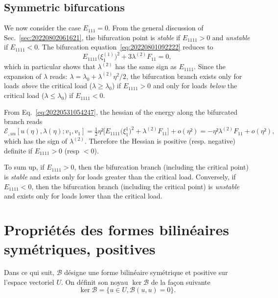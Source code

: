 \documentclass[12pt, final]{scrartcl}
\theoremstyle{definition}
\newcommand{\order}[2][1]{#2^{(#1)}}
\begin{document}
\subsection{Symmetric bifurcations}

We now consider the case \(E_{111}=0\). From the general discussion of
Sec.~\ref{sec:20220802061621}, the bifurcation point is \emph{stable} if
\(E_{1111} > 0\) and \emph{unstable} if \(E_{1111} < 0\). The bifurcation
equation~\eqref{eq:20220801092222} reduces to
\begin{equation}
  E_{1111} \bigl( \order[1]{ξ_1} \bigr)^2 + 3\order[2]λ F_{11} = 0,
\end{equation}
which in particular shows that \(\order[2]λ\) has the same sign as
\(E_{1111}\). Since the expansion of \(λ\) reads:
\(λ = λ_0 + \order[2]λ η^2 / 2\), the bifurcation branch exists only for loads
\emph{above} the critical load (\(λ ≥ λ_0\)) if \(E_{1111} > 0\) and only for
loads \emph{below} the critical load (\(λ ≤ λ_0\)) if \(E_{1111} < 0\).

From Eq.~\eqref{eq:20220531054247}, the hessian of the energy along the
bifurcated branch reads
\begin{equation*}
  ℰ_{, uu}[u(η), λ(η); v_1, v_1] = \tfrac{1}{2} η² \bigl[ E_{1111}\bigl(ξ_1^1\bigr) ^2 + \order[2]λ F_{11} \bigr] + o(η²) = - η² \order[2]λ F_{11} + o(η²),
\end{equation*}
which has the sign of \(\order[2]λ\). Therefore the Hessian is positive
(resp. negative) definite if \(E_{1111} > 0\) (resp \(< 0\)).

To sum up, if \(E_{1111} > 0\), then the bifurcation branch (including the
critical point) is \emph{stable} and exists only for loads greater than the
critical load. Conversely, if \(E_{1111} < 0\), then the bifurcation branch
(including the critical point) is \emph{unstable} and exists only for loads
lower than the critical load.

\section{Propriétés des formes bilinéaires symétriques, positives}

Dans ce qui suit, \(\mathcal{B}\) désigne une forme bilinéaire symétrique et
positive sur l'espace vectoriel \(U\). On définit son noyau \(\ker \mathcal{B}\)
de la façon suivante
\begin{equation}
 \ker \mathcal{B}= \bigl\{ u ∈ U, \mathcal{B}(u, u) = 0 \bigr\} .
\end{equation}
\end{document}
